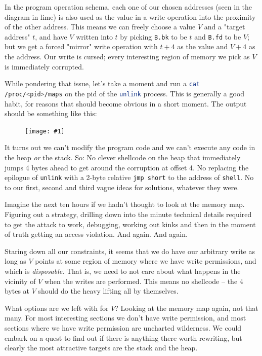\documentclass{article}
\newcommand{\displayimage}[1] {
\begin{figure}[H]
    \centering
    \texttt{[image: \#1]} 
\end{figure}
}
\newcommand{\xcode}[2]{\colorbox{ubuntuback}{\lstinline[language=#1]|#2|}}
\newcommand{\asm}[1]{\xcode{{[x86masm]assembler}}{#1}}
\newcommand{\code}[1]{\colorbox{ubuntuback}{\texttt{#1}}}
\begin{document}
In the program operation schema, each one of our chosen addresses (seen in the diagram in lime) is also used as the value in a write operation into the proximity of the other address. This means we can freely choose a value $V$ and a "target address" $t$, and have $V$ written into $t$ by picking \code{B.bk} to be $t$ and \code{B.fd} to be $V$; but we get a forced "mirror" write operation with $t+4$ as the value and $V+4$ as the address. Our write is cursed; every interesting region of memory we pick as $V$ is immediately corrupted.

While pondering that issue, let's take a moment and run a \xcode{bash}{cat /proc/<pid>/maps} on the pid of the \xcode{bash}{unlink} process. This is generally a good habit, for reasons that should become obvious in a short moment. The output should be something like this:

\displayimage{./exercises/18_unlink/memory_map.png}

It turns out we can't modify the program code and we can't execute any code in the heap \textit{or} the stack. So: No clever shellcode on the heap that immediately jumps 4 bytes ahead to get around the corruption at offset 4. No replacing the epilogue of \xcode{C}{unlink} with a 2-byte relative \asm{jmp short} to the address of \xcode{C}{shell}. No to our first, second and third vague ideas for solutions, whatever they were.

Imagine the next ten hours if we hadn't thought to look at the memory map. Figuring out a strategy, drilling down into the minute technical details required to get the attack to work, debugging, working out kinks and then in the moment of truth getting an access violation. And again. And again.

Staring down all our constraints, it seems that we do have our arbitrary write as long as $V$ points at some region of memory where we have write permissions, and which is \textit{disposable}. That is, we need to not care about what happens in the vicinity of $V$ when the writes are performed. This means no shellcode -- the 4 bytes at $V$ should do the heavy lifting all by themselves. 

What options are we left with for $V$? Looking at the memory map again, not that many. For most interesting sections we don't have write permission, and most sections where we have write permission are uncharted wilderness. We could embark on a quest to find out if there is anything there worth rewriting, but clearly the most attractive targets are the stack and the heap.
\end{document}

